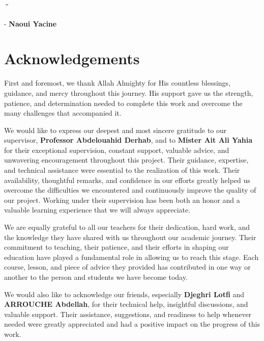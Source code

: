 \documentclass[11pt,a4paper]{report}
\begin{document}
\begin{flushright}
{\Large\textit{''}}
\end{flushright}

\begin{flushright}
- \textbf{Naoui Yacine}
\end{flushright}

\chapter*{Acknowledgements}

First and foremost, we thank Allah Almighty for His countless blessings, guidance, and mercy throughout this journey. His support gave us the strength, patience, and determination needed to complete this work and overcome the many challenges that accompanied it.

We would like to express our deepest and most sincere gratitude to our supervisor, \textbf{Professor Abdelouahid Derhab}, and to \textbf{Mister Ait Ali Yahia} for their exceptional supervision, constant support, valuable advice, and unwavering encouragement throughout this project. Their guidance, expertise, and technical assistance were essential to the realization of this work. Their availability, thoughtful remarks, and confidence in our efforts greatly helped us overcome the difficulties we encountered and continuously improve the quality of our project. Working under their supervision has been both an honor and a valuable learning experience that we will always appreciate.

We are equally grateful to all our teachers for their dedication, hard work, and the knowledge they have shared with us throughout our academic journey. Their commitment to teaching, their patience, and their efforts in shaping our education have played a fundamental role in allowing us to reach this stage. Each course, lesson, and piece of advice they provided has contributed in one way or another to the person and students we have become today.

We would also like to acknowledge our friends, especially \textbf{Djeghri Lotfi} and \textbf{ARROUCHE Abdellah}, for their technical help, insightful discussions, and valuable support. Their assistance, suggestions, and readiness to help whenever needed were greatly appreciated and had a positive impact on the progress of this work.
\end{document}
